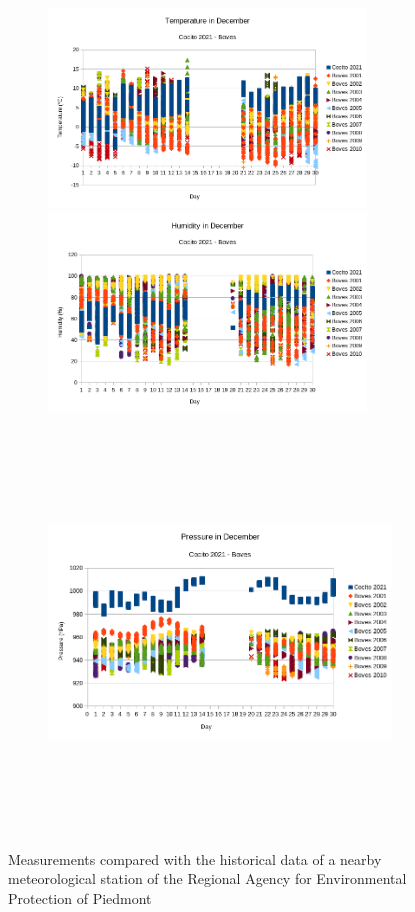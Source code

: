 \documentclass[12pt, a4paper]{article}
\begin{document}
\begin{figure}
	\begin{subfigure}{\linewidth}
		\includegraphics[height=150pt]{graficiBoves/temperature.png}
		\includegraphics[height=150pt]{graficiBoves/humidity.png}
		\caption{}
	\end{subfigure}\par\medskip
	\begin{subfigure}{\linewidth}
		\includegraphics[height=300pt]{graficiBoves/pressure.png}
		\caption{}
	\end{subfigure} 
	\caption{Measurements compared with the historical data of a nearby meteorological station of the Regional Agency for Environmental Protection of Piedmont}
\end{figure}
\end{document}
